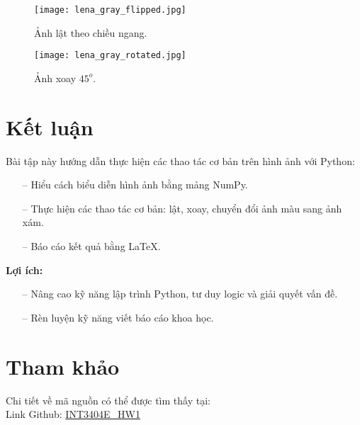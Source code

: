 \documentclass{article}
\begin{document}
\begin{figure}[htbp]
    \begin{minipage}[t]{0.5\textwidth}
        \centering
        \texttt{[image: lena\_gray\_flipped.jpg]}
        \caption{Ảnh lật theo chiều ngang.}
        \label{fig:flipped-image}
    \end{minipage}%
    \begin{minipage}[t]{0.5\textwidth}
        \centering
        \texttt{[image: lena\_gray\_rotated.jpg]}
        \caption{Ảnh xoay $45^o$.}
        \label{fig:rotated-image}
    \end{minipage}
\end{figure}
\clearpage

\section{Kết luận}

Bài tập này hướng dẫn thực hiện các thao tác cơ bản trên hình ảnh với Python:

\begin{itemize}
    \item[--] Hiểu cách biểu diễn hình ảnh bằng mảng NumPy.
    \item[--] Thực hiện các thao tác cơ bản: lật, xoay, chuyển đổi ảnh màu sang ảnh xám.
    \item[--] Báo cáo kết quả bằng LaTeX.
\end{itemize}

\textbf{Lợi ích:}

\begin{itemize}
    \item[--] Nâng cao kỹ năng lập trình Python, tư duy logic và giải quyết vấn đề.
    \item[--] Rèn luyện kỹ năng viết báo cáo khoa học.
\end{itemize}

\section{Tham khảo}

Chi tiết về mã nguồn có thể được tìm thấy tại:\\
Link Github: \href{https://github.com/ltl2702/ImageProcessing/tree/main/HW1}{INT3404E\_HW1}

\printbibliography
\end{document}
